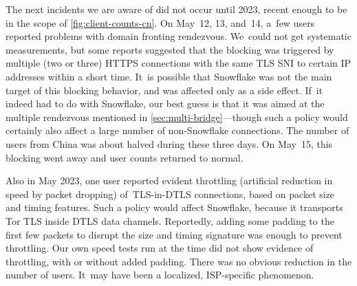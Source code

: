 \documentclass[letterpaper,twocolumn]{article}
\begin{document}
The next incidents we are aware of did not occur until 2023,
recent enough to be in the scope of \autoref{fig:client-counts-cn}.
On May~12, 13, and~14, a~few users reported problems
with domain fronting rendezvous.
We~could not get systematic measurements,
but some reports suggested that the blocking was triggered
by multiple (two or three) HTTPS connections
with the same TLS SNI to certain IP addresses within a short time.
It~is possible that Snowflake was not the main target of this
blocking behavior, and was affected only as a side effect.
If~it indeed had to do with Snowflake,
our best guess is that it was aimed at the multiple rendezvous
mentioned in \autoref{sec:multi-bridge}---though such a
policy would certainly also affect a large number of non-Snowflake connections.
The number of users from China was about halved during these three days.
On May~15, this blocking went away and user counts returned to normal.

Also in May 2023, one user reported evident throttling
(artificial reduction in speed by packet dropping)
of~TLS-in-DTLS connections,
based on packet size and timing features.
Such a policy would affect Snowflake,
because it transports Tor TLS inside DTLS data channels.
Reportedly, adding some padding to the first few packets
to disrupt the size and timing signature was enough
to prevent throttling.
Our own speed tests run at the time
did not show evidence of throttling,
with or without added padding.
There was no obvious reduction in the number of users.
It~may have been a localized, ISP-specific phenomenon.

\end{document}
